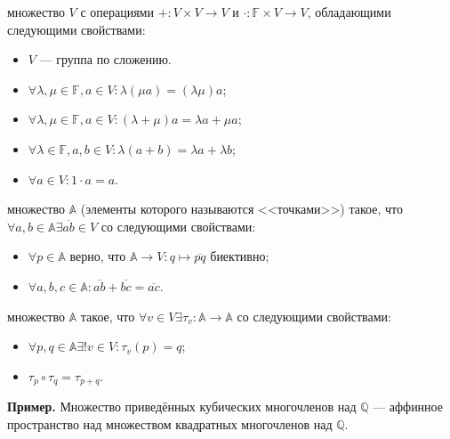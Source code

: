 \documentclass[12pt,a4paper]{article}
\begin{document}

 множество $V$ с операциями $+:V\times V\to V$ и $\cdot :\mathbb F\times V\to V$, обладающими следующими свойствами:

\begin{itemize}
	\item $V$ --- группа по сложению.
	\item $\forall \lambda,\mu\in\mathbb F,a\in V:\lambda(\mu a)=(\lambda\mu)a$;
	\item $\forall \lambda,\mu\in\mathbb F,a\in V:(\lambda+\mu)a=\lambda a+\mu a$;
	\item $\forall\lambda\in\mathbb F,a,b\in V:\lambda(a+b)=\lambda a+\lambda b$;
	\item $\forall a\in V:1\cdot a=a$.
\end{itemize}

 множество $\mathbb A$ (элементы которого называются <<точками>>) такое, что $\forall a,b\in\mathbb A\exists\overline{ab}\in V$ со следующими свойствами:

\begin{itemize}
	\item $\forall p\in\mathbb A$ верно, что $\mathbb A\to V:q\mapsto \overline{pq}$ биективно;
	\item $\forall a,b,c\in\mathbb A:\overline{ab}+\overline{bc}=\overline{ac}$.
\end{itemize}

 множество $\mathbb A$ такое, что $\forall v\in V\exists \tau_v:\mathbb A\to \mathbb A$ со следующими свойствами:

\begin{itemize}
	\item $\forall p,q\in\mathbb A\exists! v\in V:\tau_v(p)=q$;
	\item $\tau_p\circ\tau_q=\tau_{p+q}$.
\end{itemize}

\textbf{Пример.} Множество приведённых кубических многочленов над $\mathbb Q$ --- аффинное пространство над множеством квадратных многочленов над $\mathbb Q$. 
\end{document}
